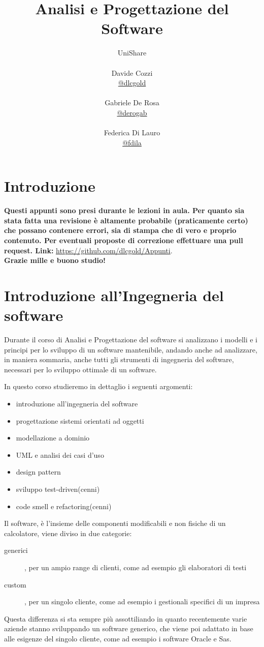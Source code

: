 \documentclass[a4paper,12pt, oneside]{book}
\title{Analisi e Progettazione del Software}
\author{UniShare\\\\Davide Cozzi\\\href{https://t.me/dlcgold}{@dlcgold}\\\\Gabriele De Rosa\\\href{https://t.me/derogab}{@derogab} \\\\Federica Di Lauro\\\href{https://t.me/f_dila}{@f\textunderscore dila}}
\date{}
\begin{document}
\maketitle


\newtheorem{teorema}{Teorema}
\newtheorem{definizione}{Definizione}
\newtheorem{esempio}{Esempio}
\newtheorem{corollario}{Corollario}
\newtheorem{lemma}{Lemma}
\newtheorem{osservazione}{Osservazione}
\newtheorem{nota}{Nota}
\newtheorem{esercizio}{Esercizio}
\tableofcontents
\renewcommand{\chaptermark}[1]{%
	\markboth{\chaptername
		\ \thechapter.\ #1}{}}
\renewcommand{\sectionmark}[1]{\markright{\thesection.\ #1}}
\chapter{Introduzione}
\textbf{Questi appunti sono presi durante le lezioni in aula. Per quanto sia stata fatta una revisione è altamente probabile (praticamente certo) che possano contenere errori, sia di stampa che di vero e proprio contenuto. Per eventuali proposte di correzione effettuare una pull request. Link: } \url{https://github.com/dlcgold/Appunti}.\\
\textbf{Grazie mille e buono studio!}
\chapter{Introduzione all'Ingegneria del software}
Durante il corso di Analisi e Progettazione del software si analizzano i modelli e i principi per lo sviluppo di un
software mantenibile, andando anche ad analizzare, in maniera sommaria, anche tutti gli strumenti di
ingegneria del software, necessari per lo sviluppo ottimale di un software.

In questo corso studieremo in dettaglio i seguenti argomenti:
\begin{itemize}
	\item introduzione all'ingegneria del software
	\item progettazione sistemi orientati ad oggetti
	\item modellazione a dominio
	\item UML e analisi dei casi d'uso
	\item design pattern
	\item sviluppo test-driven(cenni)
	\item code smell e refactoring(cenni)
\end{itemize}
Il software, è l'insieme delle componenti modificabili e non fisiche di un calcolatore, viene diviso in due categorie:
\begin{description}
	\item [generici], per un ampio range di clienti, come ad esempio gli elaboratori di testi
	\item [custom], per un singolo cliente, come ad esempio i gestionali specifici di un impresa
\end{description}
Questa differenza si sta sempre più assottiliando in quanto recentemente varie aziende stanno sviluppando un
software generico, che viene poi adattato in base alle esigenze del singolo cliente,
come ad esempio i software Oracle e Sas.
\end{document}
